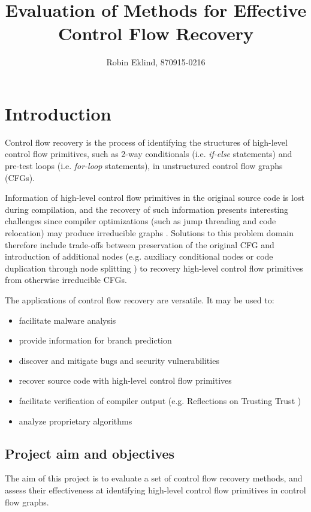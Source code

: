 \documentclass[12pt, a4paper]{article}
\title{Evaluation of Methods for Effective Control Flow Recovery}
\author{Robin Eklind, 870915-0216}
\begin{document}
\maketitle

\section{Introduction}

Control flow recovery is the process of identifying the structures of high-level control flow primitives, such as 2-way conditionals (i.e. \textit{if-else} statements) and pre-test loops (i.e. \textit{for-loop} statements), in unstructured control flow graphs (CFGs).

Information of high-level control flow primitives in the original source code is lost during compilation, and the recovery of such information presents interesting challenges since compiler optimizations (such as jump threading and code relocation) may produce irreducible graphs \cite{cifuentes_reverse_comp}. Solutions to this problem domain therefore include trade-offs between preservation of the original CFG and introduction of additional nodes (e.g. auxiliary conditional nodes \cite{no_more_gotos} or code duplication through node splitting \cite{node_splitting}) to recovery high-level control flow primitives from otherwise irreducible CFGs.

The applications of control flow recovery are versatile. It may be used to:

\begin{itemize}
	\item facilitate malware analysis
	\item provide information for branch prediction
	\item discover and mitigate bugs and security vulnerabilities
	\item recover source code with high-level control flow primitives
	\item facilitate verification of compiler output (e.g. Reflections on Trusting Trust \cite{trusting_trust})
	\item analyze proprietary algorithms
\end{itemize}

\subsection{Project aim and objectives}

The aim of this project is to evaluate a set of control flow recovery methods, and assess their effectiveness at identifying high-level control flow primitives in control flow graphs.
\end{document}

